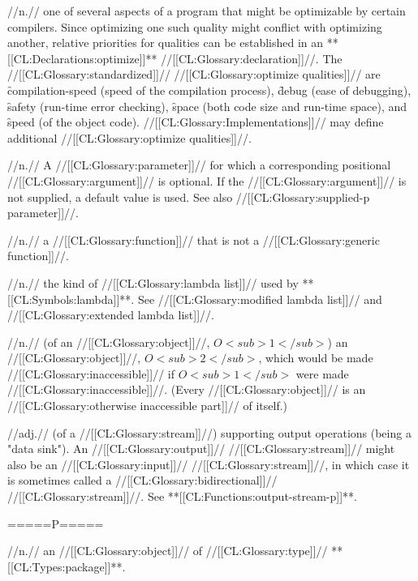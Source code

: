  //n.// one of several aspects of a program that might be optimizable by certain compilers. Since optimizing one such quality might conflict with optimizing another, relative priorities for qualities can be established in an **[[CL:Declarations:optimize]]** //[[CL:Glossary:declaration]]//. The //[[CL:Glossary:standardized]]// //[[CL:Glossary:optimize qualities]]// are \f{compilation-speed} (speed of the compilation process), 
 \f{debug} (ease of debugging), \f{safety} (run-time error checking), \f{space} (both code size and run-time space), and \f{speed} (of the object code). //[[CL:Glossary:Implementations]]// may define additional //[[CL:Glossary:optimize qualities]]//.

 //n.// A //[[CL:Glossary:parameter]]// for which a corresponding positional //[[CL:Glossary:argument]]// is optional. If the //[[CL:Glossary:argument]]// is not supplied, a default value is used. See also //[[CL:Glossary:supplied-p parameter]]//.

 //n.// a //[[CL:Glossary:function]]// that is not a //[[CL:Glossary:generic function]]//.

 //n.// the kind of //[[CL:Glossary:lambda list]]// used by **[[CL:Symbols:lambda]]**. See //[[CL:Glossary:modified lambda list]]// and //[[CL:Glossary:extended lambda list]]//. 

 //n.// (of an //[[CL:Glossary:object]]//, $O<sub>1</sub>$) an //[[CL:Glossary:object]]//, $O<sub>2</sub>$, which would be made //[[CL:Glossary:inaccessible]]// if $O<sub>1</sub>$ were made //[[CL:Glossary:inaccessible]]//. (Every //[[CL:Glossary:object]]// is an //[[CL:Glossary:otherwise inaccessible part]]// of itself.)

 //adj.// (of a //[[CL:Glossary:stream]]//) supporting output operations (\ie being a "data sink"). An //[[CL:Glossary:output]]// //[[CL:Glossary:stream]]// might also be an //[[CL:Glossary:input]]// //[[CL:Glossary:stream]]//, in which case it is sometimes called a //[[CL:Glossary:bidirectional]]// //[[CL:Glossary:stream]]//. See **[[CL:Functions:output-stream-p]]**.

=====P=====
 
 //n.// an //[[CL:Glossary:object]]// of //[[CL:Glossary:type]]// **[[CL:Types:package]]**.

